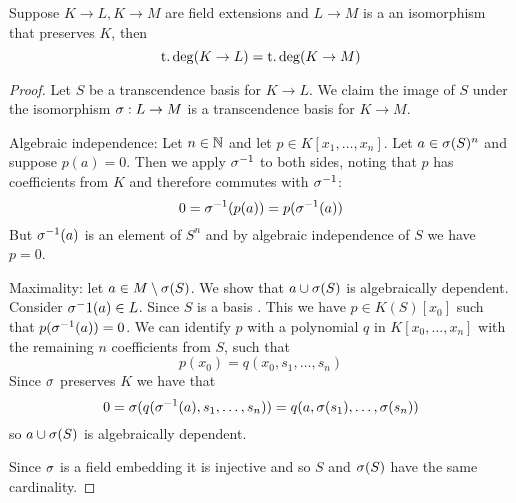 \begin{lem}
    Suppose $K \to L, K \to M$ are field extensions and 
    $L \to M$ is a an isomorphism that preserves $K$,
    then 
    \[\operatorname{t.deg}(K \to L) = \operatorname{t.deg}(K \to M)\]
\end{lem}
\begin{proof}
    Let $S$ be a transcendence basis for $K \to L$.
    We claim the image of $S$ under the isomorphism $\sigma: L \to M$ is 
    a transcendence basis for $K \to M$.

    Algebraic independence: Let $n \in \mathbb{N}$ and 
    let $p \in K[x_1,\dots,x_n]$. 
    Let $a \in \sigma(S)^n$ and suppose $p(a) = 0$.
    Then we apply $\sigma^{-1}$ to both sides, 
    noting that $p$ has coefficients 
    from $K$ and therefore commutes with $\sigma^{-1}$:
    \[0 = \sigma^{-1}(p(a)) = p(\sigma^{-1}(a))\]
    But $\sigma^{-1}(a)$ is an element of $S^n$
    and by algebraic independence of $S$ we have $p = 0$.

    Maximality: let $a \in M \setminus \sigma(S)$. 
    We show that $a \cup \sigma(S)$ is algebraically dependent.
    Consider $\sigma^-1(a) \in L$.
    Since $S$ is a basis 
    .
    This we have $p \in K(S)[x_0]$ such that 
    $p(\sigma^{-1}(a)) = 0$.
    We can identify $p$ with a polynomial $q$ in $K[x_0,\dots,x_n]$ 
    with the remaining $n$ coefficients from $S$,
    such that 
    \[p(x_0) = q(x_0,s_1,\dots,s_n)\]
    Since $\sigma$ preserves $K$ we have that 
    \[0 = \sigma(q(\sigma^{-1}(a),s_1,\dots,s_n)) = q(a, \sigma(s_1),\dots,\sigma(s_n))\]
    so $a \cup \sigma(S)$ is algebraically dependent.

    Since $\sigma$ is a field embedding it is injective and so 
    $S$ and $\sigma(S)$ have the same cardinality.
\end{proof}